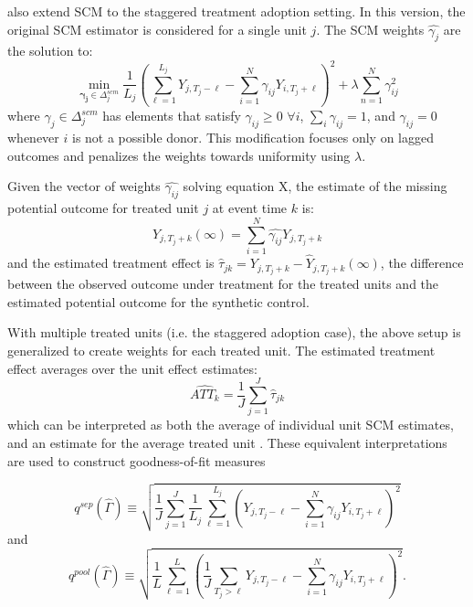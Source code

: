 \documentclass[12pt]{amsart}
\begin{document}
 also extend SCM to the staggered treatment adoption setting. In this version, the original SCM estimator is considered for a single unit $j$. The SCM weights $\hat{\gamma_j}$ are the solution to:
\begin{equation}
    \underset{\bm{\gamma_{j}}\in\Delta_{j}^{scm}}{\min} \frac{1}{L_j} \left( \sum_{\ell=1}^{L_j} Y_{j,T_j -\ell} - \sum_{i=1}^{N}\gamma_{ij}Y_{i,T_j + \ell} \right )^2 + \lambda \sum_{n=1}^{N}\gamma_{ij}^2
\end{equation}
where $\gamma_{j}\in\Delta_{j}^{scm}$ has elements that satisfy $\gamma_{ij} \geq 0$ $\forall i$, $\sum_i \gamma_{ij} = 1$, and $\gamma_{ij} = 0$ whenever $i$ is not a possible donor. This modification focuses only on lagged outcomes and penalizes the weights towards uniformity using $\lambda$. 

Given the vector of weights $\hat{\gamma_{ij}}$ solving equation X, the estimate of the missing potential outcome for treated unit $j$ at event time $k$ is:
\begin{equation}
    \hat{Y}_{j,T_j + k}(\infty) = \sum_{i=1}^{N}\hat{\gamma_{ij}}Y_{j,T_j + k}
\end{equation}
and the estimated treatment effect is $\hat{\tau}_{jk} = Y_{j,T_j + k} - \hat{Y}_{j,T_j + k}(\infty)$, the difference between the observed outcome under treatment for the treated units and the estimated potential outcome for the synthetic control. 

With multiple treated units (i.e. the staggered adoption case), the above setup is generalized to create weights for each treated unit. The estimated treatment effect averages over the unit effect estimates:
\begin{equation}
    \hat{ATT_k} = \frac{1}{J}\sum_{j=1}^{J}\hat{\tau}_{jk}
\end{equation}
 which can be interpreted as both the average of individual unit SCM estimates, and an estimate for the average treated unit \cite{BEN-MICHAEL_FELLER_ROTHSTEIN:2021}. These equivalent interpretations are used to construct goodness-of-fit measures
 
 \begin{equation}
     q^{sep}(\hat{\Gamma}) \equiv \sqrt{\frac{1}{J} \sum_{j=1}^{J} \frac{1}{L_j} \sum_{\ell=1}^{L_j} \left(Y_{j,T_j -\ell} - \sum_{i=1}^{N}\gamma_{ij}Y_{i,T_j + \ell} \right )^2} 
 \end{equation}
and 
 \begin{equation}
     q^{pool}(\hat{\Gamma}) \equiv \sqrt{\frac{1}{L} \sum_{\ell=1}^{L} \left(\frac{1}{J} \sum_{T_j > \ell}Y_{j,T_j -\ell} - \sum_{i=1}^{N}\gamma_{ij}Y_{i,T_j + \ell} \right )^2}. 
 \end{equation}
\end{document}
